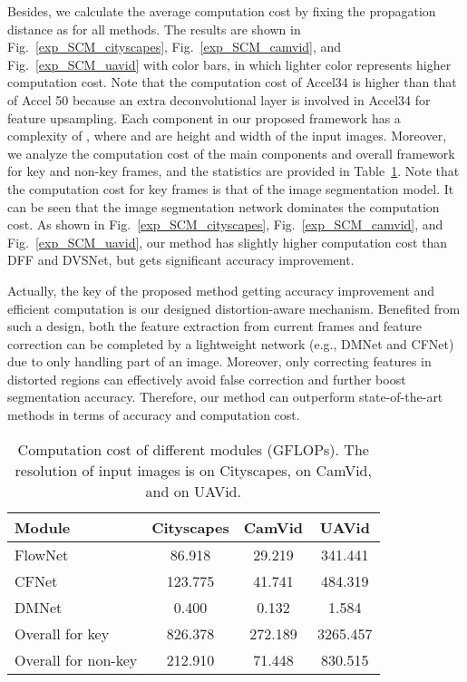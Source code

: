 \documentclass[journal]{IEEEtran}
\begin{document}
Besides, we calculate the average computation cost by fixing the propagation distance as  for all methods. The results are shown in Fig.~\ref{exp_SCM_cityscapes}, Fig.~\ref{exp_SCM_camvid}, and Fig.~\ref{exp_SCM_uavid} with color bars, in which lighter color represents higher computation cost. Note that the computation cost of Accel34 is higher than that of Accel 50 because an extra deconvolutional layer is involved in Accel34 for feature upsampling. Each component in our proposed framework has a complexity of , where  and  are height and width of the input images. Moreover, we analyze the computation cost of the main components and overall framework for key and non-key frames, and the statistics are provided in Table~\ref{computaion}. Note that the computation cost for key frames is that of the image segmentation model. It can be seen that the image segmentation network dominates the computation cost. As shown in Fig.~\ref{exp_SCM_cityscapes}, Fig.~\ref{exp_SCM_camvid}, and Fig.~\ref{exp_SCM_uavid}, our method has slightly higher computation cost than DFF and DVSNet, but gets significant accuracy improvement.

Actually, the key of the proposed method getting accuracy improvement and efficient computation is our designed distortion-aware mechanism. Benefited from such a design, both the feature extraction from current frames and feature correction can be completed by a lightweight network (e.g., DMNet and CFNet) due to only handling part of an image.  Moreover, only correcting features in distorted regions can effectively avoid false correction and further boost segmentation accuracy. Therefore, our method can outperform state-of-the-art methods in terms of accuracy and computation cost.


\begin{table}[t]
	\caption{Computation cost of different modules (GFLOPs). The resolution of input images is  on Cityscapes,  on CamVid, and  on UAVid.}
	\begin{center}
		\renewcommand{\arraystretch}{1.3}
		\begin{tabular}{l|c|c|c}
			\hline
			Module             	& Cityscapes	& CamVid	& UAVid    	\\
			\hline
			FlowNet 			& 86.918		& 29.219	& 341.441	\\
			CFNet 				& 123.775		& 41.741	& 484.319	\\
			DMNet 				& 0.400			& 0.132		& 1.584		\\
			\hline
			Overall for key		& 826.378		& 272.189	& 3265.457	\\
			Overall for non-key	& 212.910		& 71.448	& 830.515	\\
			\hline
		\end{tabular}
	\end{center}
	\label{computaion}
\end{table}
\end{document}

